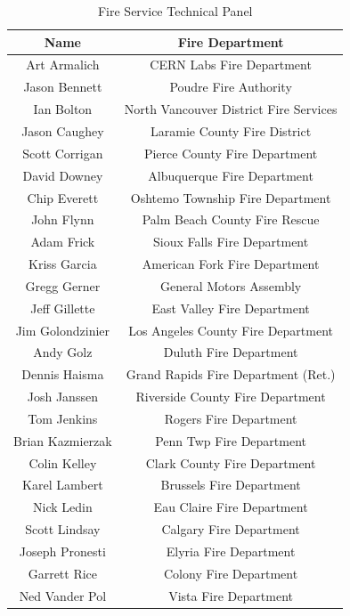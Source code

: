 \documentclass{article}
\begin{document}
\begin{table}[H]
	\centering
	\caption{Fire Service Technical Panel}
	\begin{tabular}{|c|c|}
		\hline
		\bf{Name} & \bf{Fire Department} \\ \hline \hline
		Art Armalich & CERN Labs Fire Department \\ \hline
		Jason Bennett & Poudre Fire Authority \\ \hline
		Ian Bolton & North Vancouver District Fire Services \\ \hline
		Jason Caughey & Laramie County Fire District \\ \hline
		Scott Corrigan & Pierce County Fire Department \\ \hline
		David Downey & Albuquerque Fire Department \\ \hline
		Chip Everett & Oshtemo Township Fire Department \\ \hline
		John Flynn & Palm Beach County Fire Rescue \\ \hline
		Adam Frick & Sioux Falls Fire Department \\ \hline
		Kriss Garcia & American Fork Fire Department \\ \hline
		Gregg Gerner & General Motors Assembly \\ \hline
		Jeff Gillette & East Valley Fire Department \\ \hline
		Jim Golondzinier & Los Angeles County Fire Department \\ \hline
		Andy Golz & Duluth Fire Department \\ \hline
		Dennis Haisma & Grand Rapids Fire Department (Ret.) \\ \hline
		Josh Janssen & Riverside County Fire Department \\ \hline
		Tom Jenkins & Rogers Fire Department \\ \hline
		Brian Kazmierzak & Penn Twp Fire Department \\ \hline
		Colin Kelley & Clark County Fire Department \\ \hline
		Karel Lambert & Brussels Fire Department \\ \hline
		Nick Ledin & Eau Claire Fire Department \\ \hline
		Scott Lindsay & Calgary Fire Department \\ \hline
		Joseph Pronesti & Elyria Fire Department \\ \hline
		Garrett Rice & Colony Fire Department \\ \hline
		Ned Vander Pol & Vista Fire Department \\ \hline
	\end{tabular}
	\label{tab:TechPanelList}
\end{table}
\end{document}
